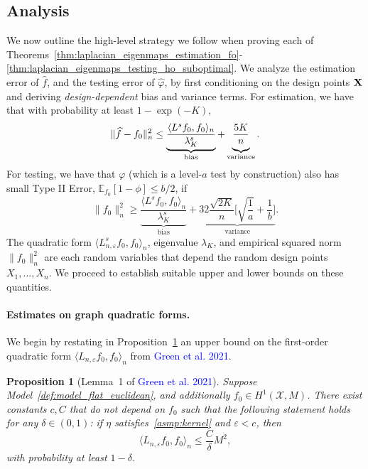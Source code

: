 \documentclass{article}
\newcommand{\1}{\mathbf{1}}
\newcommand{\mc}[1]{\mathcal{#1}}
\newcommand{\Ebb}{\mathbb{E}}
\newcommand{\dotp}[2]{\langle #1, #2 \rangle}
\newcommand{\wh}[1]{\widehat{#1}}
\theoremstyle{alden}
\theoremstyle{aldenthm}
\newtheorem{proposition}{Proposition}
\theoremstyle{definition}
\theoremstyle{remark}
\begin{document}
\subsection{Analysis}
\label{subsec:analysis}

We now outline the high-level strategy we follow when proving each of Theorems~\ref{thm:laplacian_eigenmaps_estimation_fo}-\ref{thm:laplacian_eigenmaps_testing_ho_suboptimal}. We analyze the estimation error of $\wh{f}$, and the testing error of $\wh{\varphi}$, by first conditioning on the design points ${\bf X}$ and deriving \emph{design-dependent} bias and variance terms. For estimation, we have that with probability at least $1 - \exp(-K)$,
\begin{equation}
\label{eqn:estimation_biasvariance}
\|\wh{f} - f_0\|_n^2 \leq \underbrace{\frac{\dotp{L^s f_0}{f_0}_n}{\lambda_{K}^s}}_{\textrm{bias}} + \underbrace{\frac{5K}{n} \vphantom{\frac{\dotp{L^s f_0}{f_0}_n}{\lambda_{K}^s}}}_{\textrm{variance}}.
\end{equation}
For testing, we have that $\varphi$ (which is a level-$a$ test by construction) also has small Type II Error, $\Ebb_{f_0}[1 - \phi] \leq b/2$, if 
\begin{equation}
\label{eqn:testing_biasvariance}
\|f_0\|_n^2 \geq  \underbrace{\frac{\dotp{L^s f_0}{f_0}_n}{\lambda_{K}^s}}_{\textrm{bias}} + \underbrace{32\frac{\sqrt{2K}}{n}\biggl[\sqrt{\frac{1}{a}} + \frac{1}{b}\biggr]}_{\textrm{variance}}.
\end{equation}
The quadratic form $\dotp{L_{n,\varepsilon}^s f_0}{f_0}_n$, eigenvalue $\lambda_{K}$, and empirical squared norm $\|f_0\|_n^2$ are each random variables that depend the random design points $X_1,\ldots,X_n$. We proceed to establish suitable upper and lower bounds on these quantities. 

\paragraph{Estimates on graph quadratic forms.}
We begin by restating in Proposition~\ref{prop:graph_seminorm_fo} an upper bound on the first-order quadratic form $\dotp{L_{n,\varepsilon}f_0}{f_0}_n$ from \textcolor{blue}{Green et al. 2021}.
\begin{proposition}[Lemma~1 of \textcolor{blue}{Green et al. 2021}]
	\label{prop:graph_seminorm_fo}
	Suppose Model~\ref{def:model_flat_euclidean}, and additionally $f_0 \in H^1(\mc{X},M)$. There exist constants $c,C$ that do not depend on $f_0$ such that the following statement holds for any $\delta \in (0,1)$: if $\eta$ satisfies~\ref{asmp:kernel} and $\varepsilon < c$, then
	\begin{equation}
	\label{eqn:graph_seminorm_fo}
	\dotp{L_{n,\varepsilon}f_0}{f_0}_n \leq \frac{C}{\delta} M^2,
	\end{equation}
	with probability at least $1 - \delta$.
\end{proposition}
\end{document}
